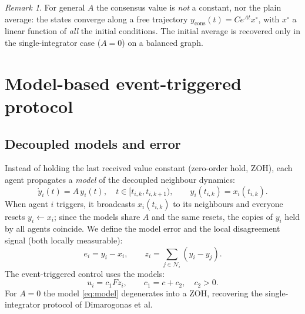 \documentclass[11pt,a4paper]{article}
\theoremstyle{remark}
\newtheorem{remark}{Remark}
\newcommand{\Ni}{\mathcal{N}_i}
\begin{document}
\begin{remark}
For general $A$ the consensus value is \emph{not} a constant, nor the plain average: the states
converge along a free trajectory $y_{\mathrm{cons}}(t)=Ce^{At}x^\circ$, with $x^\circ$ a linear
function of \emph{all} the initial conditions. The initial average is recovered only in the
single-integrator case ($A=0$) on a balanced graph.
\end{remark}

\section{Model-based event-triggered protocol}

\subsection{Decoupled models and error}
Instead of holding the last received value constant (zero-order hold, ZOH), each agent propagates
a \emph{model} of the decoupled neighbour dynamics:
\begin{equation}
\dot y_i(t) = A\,y_i(t), \quad t\in[t_{i,k},t_{i,k+1}), \qquad y_i(t_{i,k}) = x_i(t_{i,k}).
\label{eq:model}
\end{equation}
When agent $i$ triggers, it broadcasts $x_i(t_{i,k})$ to its neighbours and everyone resets
$y_i\!\leftarrow\!x_i$; since the models share $A$ and the same resets, the copies of $y_i$ held by
all agents coincide. We define the model error and the local disagreement signal (both locally
measurable):
\begin{equation}
e_i = y_i - x_i, \qquad z_i = \sum_{j\in\Ni}(y_i - y_j).
\end{equation}
The event-triggered control uses the models:
\begin{equation}
u_i = c_1 F z_i, \qquad c_1 = c + c_2, \quad c_2>0.
\label{eq:uet}
\end{equation}
For $A=0$ the model \eqref{eq:model} degenerates into a ZOH, recovering the single-integrator
protocol of Dimarogonas et al.
\end{document}
